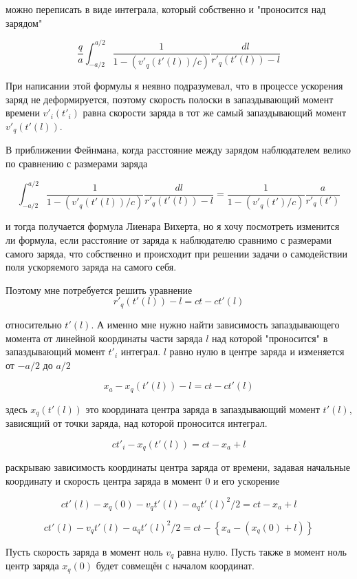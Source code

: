 \documentclass{article}
\begin{document}
можно переписать в виде интеграла, который собственно и "проносится над зарядом"

$$\frac{q}{a}\int_{-a/2}^{a/2}\frac{1}{1- (v'_{q}(t'(l))/c)} \frac{dl }{r'_{q}(t'(l))-l}$$

При написании этой формулы я неявно подразумевал, что в процессе ускорения заряд не деформируется, поэтому скорость полоски в запаздывающий момент времени $v'_{i}(t'_{i})$ равна скорости заряда в тот же самый запаздывающий момент  $v'_{q}(t'(l))$.

В приближении Фейнмана, когда расстояние между зарядом наблюдателем велико по сравнению с размерами заряда

$$\int_{-a/2}^{a/2}\frac{1}{1- (v'_{q}(t'(l))/c)} \frac{dl }{r'_{q}(t'(l))-l} = \frac{1}{1- (v'_{q}(t')/c)}\frac{a}{r'_{q}(t')}$$

и тогда получается формула Лиенара Вихерта, но я хочу посмотреть изменится ли формула, если расстояние от заряда к наблюдателю сравнимо с размерами самого заряда, что собственно и происходит при решении задачи о самодействии поля ускоряемого заряда на самого себя.

Поэтому мне потребуется решить уравнение
$$r'_{q}(t'(l))-l= c t - c t'(l)$$

относительно $t'(l)$. А именно мне нужно найти зависимость запаздывающего момента от линейной координаты части заряда $l$ над которой "проносится" в запаздывающий момент  $t'_{i}$ интеграл. $l$ равно нулю в центре заряда и изменяется от $-a/2$ до ${a/2}$

$$x_a-x_q\left(t'(l)\right)-l= c t - c t'(l)$$

здесь $x_q\left(t'(l)\right)$ это координата центра заряда в запаздывающий момент $t'(l)$, зависящий от точки заряда, над которой проносится интеграл.

$$ c t'_{i}-x_q\left(t'(l)\right)= c t - x_a+l$$

раскрываю зависимость координаты центра заряда от времени, задавая начальные координату и скорость центра заряда в момент 0 и его ускорение

$$ c t'(l)-x_{q}(0) - v_q t'(l) - a_q {t'(l)}^{2} / 2 = c t - x_a+l$$

$$ c t'(l) - v_q t'(l) - a_q {t'(l)}^{2} / 2 = c t - \left\{x_a - (x_{q}(0) + l)\right\}$$

Пусть скорость заряда в момент ноль $v_q$ равна нулю. Пусть также в момент ноль центр заряда $x_{q}(0)$ будет совмещён с началом координат.

\end{document}
